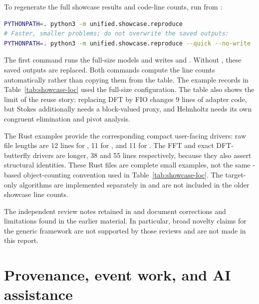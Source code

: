\documentclass[11pt,a4paper]{article}
\begin{document}
To regenerate the full showcase results and code-line counts, run from :
\begin{lstlisting}[language=bash]
PYTHONPATH=. python3 -m unified.showcase.reproduce
# Faster, smaller problems; do not overwrite the saved outputs:
PYTHONPATH=. python3 -m unified.showcase.reproduce --quick --no-write
\end{lstlisting}
The first command runs the full-size models and writes  and . Without , these saved outputs are replaced. Both commands compute the line counts automatically rather than copying them from the table. The example records in Table~\ref{tab:showcase-loc} used the full-size configuration. The table also shows the limit of the reuse story: replacing DFT by FIO changes 9 lines of adapter code, but Stokes additionally needs a block-valued proxy, and Helmholtz needs its own congruent elimination and pivot analysis.

The Rust examples provide the corresponding compact user-facing drivers: raw file lengths are 12 lines for , 11 for , and 11 for . The FFT and exact DFT-butterfly drivers are longer, 38 and 55 lines respectively, because they also assert structural identities. These Rust files are complete small examples, not the same -based object-counting convention used in Table~\ref{tab:showcase-loc}. The target-only algorithms are implemented separately in  and are not included in the older showcase line counts.


The independent review notes retained in  and  document corrections and limitations found in the earlier material. In particular, broad novelty claims for the generic framework are not supported by those reviews and are not made in this report.

\section{Provenance, event work, and AI assistance}
\label{app:provenance}
\end{document}
